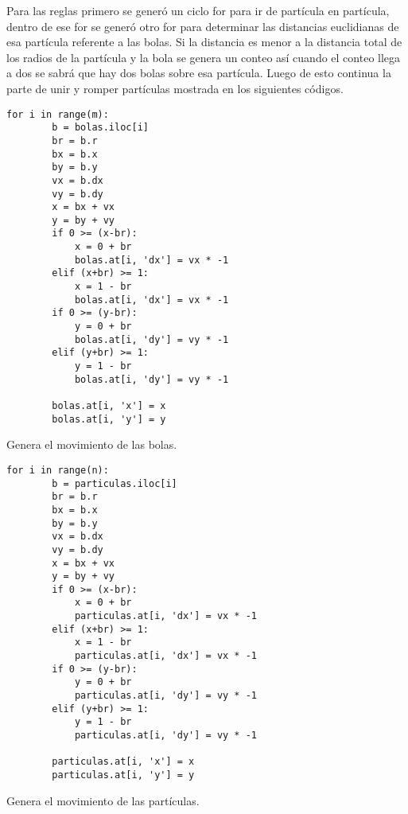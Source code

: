 \documentclass{article}
\begin{document}
Para las reglas primero se generó un ciclo for para ir de partícula en partícula, dentro de ese for se generó otro for para determinar las distancias euclidianas de esa partícula referente a las bolas. Si la distancia es menor a la distancia total de los radios de la partícula y la bola se genera un conteo así cuando el conteo llega a dos se sabrá que hay dos bolas sobre esa partícula. Luego de esto continua la parte de unir y romper partículas mostrada en los siguientes códigos.

\renewcommand{\listingscaption}{Código}
\begin{listing}[H]
  \begin{verbatim}
for i in range(m):
        b = bolas.iloc[i]
        br = b.r
        bx = b.x
        by = b.y
        vx = b.dx
        vy = b.dy
        x = bx + vx
        y = by + vy
        if 0 >= (x-br):
            x = 0 + br
            bolas.at[i, 'dx'] = vx * -1
        elif (x+br) >= 1:
            x = 1 - br
            bolas.at[i, 'dx'] = vx * -1
        if 0 >= (y-br):
            y = 0 + br
            bolas.at[i, 'dy'] = vy * -1
        elif (y+br) >= 1:
            y = 1 - br
            bolas.at[i, 'dy'] = vy * -1
        
        bolas.at[i, 'x'] = x
        bolas.at[i, 'y'] = y
      \end{verbatim}
  \label{lst:fibo}
  \caption{Genera el movimiento de las bolas.}
\end{listing}

\renewcommand{\listingscaption}{Código}
\begin{listing}[H]
  \begin{verbatim}
for i in range(n):
        b = particulas.iloc[i]
        br = b.r
        bx = b.x
        by = b.y
        vx = b.dx
        vy = b.dy
        x = bx + vx
        y = by + vy
        if 0 >= (x-br):
            x = 0 + br
            particulas.at[i, 'dx'] = vx * -1
        elif (x+br) >= 1:
            x = 1 - br
            particulas.at[i, 'dx'] = vx * -1
        if 0 >= (y-br):
            y = 0 + br
            particulas.at[i, 'dy'] = vy * -1
        elif (y+br) >= 1:
            y = 1 - br
            particulas.at[i, 'dy'] = vy * -1
        
        particulas.at[i, 'x'] = x
        particulas.at[i, 'y'] = y
      \end{verbatim}
  \label{lst:fibo}
  \caption{Genera el movimiento de las partículas.}
\end{listing}
\end{document}
